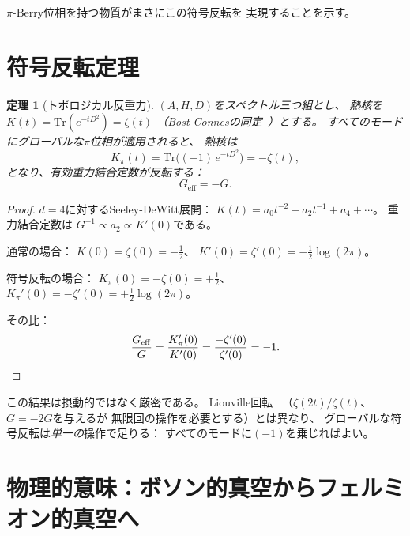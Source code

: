 \documentclass[11pt,a4paper,twocolumn]{article}
\newtheorem{theorem}{定理}
\newcommand{\Tr}{\mathrm{Tr}}
\begin{document}
$\pi$-Berry位相を持つ物質がまさにこの符号反転を
実現することを示す。

\section{符号反転定理}

\begin{theorem}[トポロジカル反重力]
\label{thm:antigrav}
$(A, H, D)$をスペクトル三つ組とし、
熱核を$K(t) = \Tr(e^{-tD^2}) = \zeta(t)$
（Bost-Connesの同定~\cite{BostConnes1995}）とする。
すべてのモードにグローバルな$\pi$位相が適用されると、
熱核は
\begin{equation}
  K_\pi(t) = \Tr\bigl((-1)\,e^{-tD^2}\bigr) = -\zeta(t),
  \label{eq:minus_zeta}
\end{equation}
となり、有効重力結合定数が反転する：
\begin{equation}
  \boxed{\;G_{\mathrm{eff}} = -G.\;}
  \label{eq:G_neg}
\end{equation}
\end{theorem}

\begin{proof}
$d = 4$に対するSeeley-DeWitt展開：
$K(t) = a_0 t^{-2} + a_2 t^{-1} + a_4 + \cdots$。
重力結合定数は
$G^{-1} \propto a_2 \propto K'(0)$である。

通常の場合：
$K(0) = \zeta(0) = -\tfrac{1}{2}$、
$K'(0) = \zeta'(0) = -\tfrac{1}{2}\log(2\pi)$。

符号反転の場合：
$K_\pi(0) = -\zeta(0) = +\tfrac{1}{2}$、
$K_\pi'(0) = -\zeta'(0) = +\tfrac{1}{2}\log(2\pi)$。

その比：
\begin{equation}
  \frac{G_{\mathrm{eff}}}{G}
  = \frac{K_\pi'(0)}{K'(0)}
  = \frac{-\zeta'(0)}{\zeta'(0)}
  = -1. \qedhere
\end{equation}
\end{proof}

この結果は摂動的ではなく厳密である。
Liouville回転~\cite{WB_gravity_control}
（$\zeta(2t)/\zeta(t)$、$G = -2G$を与えるが
無限回の操作を必要とする）とは異なり、
グローバルな符号反転は\emph{単一の}操作で足りる：
すべてのモードに$(-1)$を乗じればよい。

\section{物理的意味：ボソン的真空からフェルミオン的真空へ}
\end{document}
